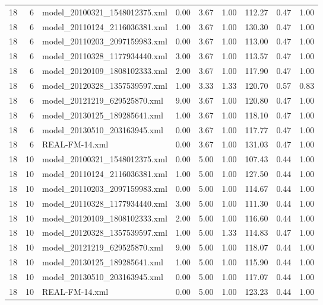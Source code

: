 \begin{table}[ht]
\begin{tabular}{rrlrrrrrr}
   18 &   6 & model\_20100321\_1548012375.xml & 0.00 & 3.67 & 1.00 & 112.27 & 0.47 & 1.00 \\ 
   18 &   6 & model\_20110124\_2116036381.xml & 1.00 & 3.67 & 1.00 & 130.30 & 0.47 & 1.00 \\ 
   18 &   6 & model\_20110203\_2097159983.xml & 0.00 & 3.67 & 1.00 & 113.00 & 0.47 & 1.00 \\ 
   18 &   6 & model\_20110328\_1177934440.xml & 3.00 & 3.67 & 1.00 & 113.57 & 0.47 & 1.00 \\ 
   18 &   6 & model\_20120109\_1808102333.xml & 2.00 & 3.67 & 1.00 & 117.90 & 0.47 & 1.00 \\ 
   18 &   6 & model\_20120328\_1357539597.xml & 1.00 & 3.33 & 1.33 & 120.70 & 0.57 & 0.83 \\ 
   18 &   6 & model\_20121219\_629525870.xml & 9.00 & 3.67 & 1.00 & 120.80 & 0.47 & 1.00 \\ 
   18 &   6 & model\_20130125\_189285641.xml & 1.00 & 3.67 & 1.00 & 118.10 & 0.47 & 1.00 \\ 
   18 &   6 & model\_20130510\_203163945.xml & 0.00 & 3.67 & 1.00 & 117.77 & 0.47 & 1.00 \\ 
   18 &   6 & REAL-FM-14.xml & 0.00 & 3.67 & 1.00 & 131.03 & 0.47 & 1.00 \\ 
   18 &  10 & model\_20100321\_1548012375.xml & 0.00 & 5.00 & 1.00 & 107.43 & 0.44 & 1.00 \\ 
   18 &  10 & model\_20110124\_2116036381.xml & 1.00 & 5.00 & 1.00 & 127.50 & 0.44 & 1.00 \\ 
   18 &  10 & model\_20110203\_2097159983.xml & 0.00 & 5.00 & 1.00 & 114.67 & 0.44 & 1.00 \\ 
   18 &  10 & model\_20110328\_1177934440.xml & 3.00 & 5.00 & 1.00 & 111.30 & 0.44 & 1.00 \\ 
   18 &  10 & model\_20120109\_1808102333.xml & 2.00 & 5.00 & 1.00 & 116.60 & 0.44 & 1.00 \\ 
   18 &  10 & model\_20120328\_1357539597.xml & 1.00 & 5.00 & 1.33 & 114.83 & 0.47 & 1.00 \\ 
   18 &  10 & model\_20121219\_629525870.xml & 9.00 & 5.00 & 1.00 & 118.07 & 0.44 & 1.00 \\ 
   18 &  10 & model\_20130125\_189285641.xml & 1.00 & 5.00 & 1.00 & 115.90 & 0.44 & 1.00 \\ 
   18 &  10 & model\_20130510\_203163945.xml & 0.00 & 5.00 & 1.00 & 117.07 & 0.44 & 1.00 \\ 
   18 &  10 & REAL-FM-14.xml & 0.00 & 5.00 & 1.00 & 123.23 & 0.44 & 1.00 \\ 

\end{tabular}
\end{table}
